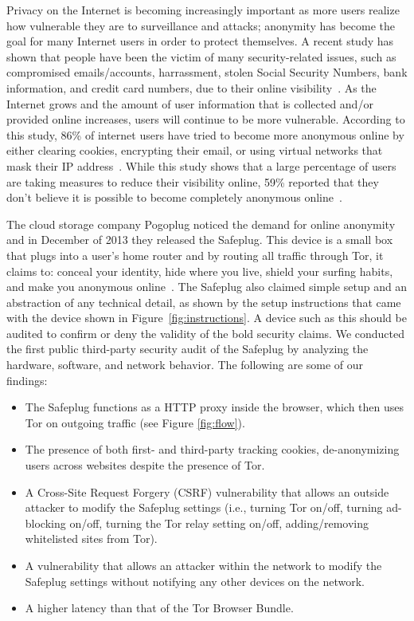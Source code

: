 \documentclass[conference]{IEEEtran}
\begin{document}
Privacy on the Internet is becoming increasingly important as more users realize how vulnerable they are to surveillance and attacks; anonymity has become the goal for many Internet users in order to protect themselves.  A recent study has shown that people have been the victim of many security-related issues, such as compromised emails/accounts, harrassment, stolen Social Security Numbers, bank information, and credit card numbers, due to their online visibility~\cite{pew}.  As the Internet grows and the amount of user information that is collected and/or provided online increases, users will continue to be more vulnerable.  According to this study, 86\% of internet users have tried to become more anonymous online by either clearing cookies, encrypting their email, or using virtual networks that mask their IP address~\cite{pew}.  While this study shows that a large percentage of users are taking measures to reduce their visibility online, 59\% reported that they don't believe it is possible to become completely anonymous online~\cite{pew}.  

The cloud storage company Pogoplug noticed the demand for online anonymity and in December of 2013 they released the Safeplug.  This device is a small box that plugs into a user's home router and by routing all traffic through Tor, it claims to: conceal your identity, hide where you live, shield your surfing habits, and make you anonymous online~\cite{pogo}.  The Safeplug also claimed simple setup and an abstraction of any technical detail, as shown by the setup instructions that came with the device shown in Figure~\ref{fig:instructions}.  A device such as this should be audited to confirm or deny the validity of the bold security claims.  We conducted the first public third-party security audit of the Safeplug by analyzing the hardware, software, and network behavior.  The following are some of our findings:

\begin{itemize}
\item The Safeplug functions as a HTTP proxy inside the browser, which then uses Tor on outgoing traffic (see Figure \ref{fig:flow}).
\item The presence of both first- and third-party tracking cookies, de-anonymizing users across websites despite the presence of Tor.
\item A Cross-Site Request Forgery (CSRF) vulnerability that allows an outside attacker to modify the Safeplug settings (i.e., turning Tor on/off, turning ad-blocking on/off, turning the Tor relay setting on/off, adding/removing whitelisted sites from Tor).
\item A vulnerability that allows an attacker within the network to modify the Safeplug settings without notifying any other devices on the network.
\item A higher latency than that of the Tor Browser Bundle.
\end{itemize} 
\end{document}
